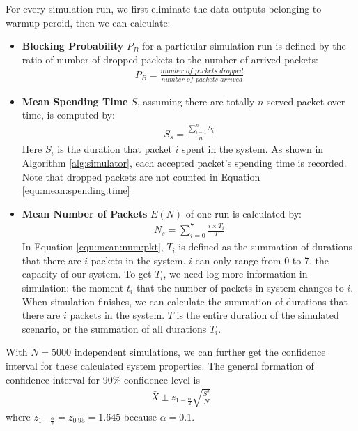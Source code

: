 \documentclass[12pt]{article}  %
\theoremstyle{definition}
\theoremstyle{remark}
\begin{document}
For every simulation run, we first eliminate the data outputs belonging to warmup peroid, then we can calculate:
\begin{itemize}
\item \textbf{Blocking Probability} $P_B$ for a particular simulation run is defined by the ratio of number of dropped packets to the number of arrived packets:
\begin{align}
        \label{equ:block:prob}
        P_B = \frac{\textit{number of packets dropped}}{\textit{number of packets arrived}}
\end{align}

\item \textbf{Mean Spending Time} $S$, assuming there are totally $n$ served packet over time, is computed by:
\begin{align}
        \label{equ:mean:spending:time}
        S_s = \frac{\sum_{i=1}^{n}S_i}{n}
\end{align}
Here $S_i$ is the duration that packet $i$ spent in the system. 
As shown in Algorithm \ref{alg:simulator}, each accepted packet's spending time is recorded. 
Note that dropped packets are not counted in Equation \ref{equ:mean:spending:time}
\item \textbf{Mean Number of Packets} $E(N)$ of one run is calculated by:
\begin{align}
        \label{equ:mean:num:pkt}
        N_s = \sum_{i=0}^{7}\frac{i \times T_i}{T}
\end{align}
In Equation \ref{equ:mean:num:pkt}, $T_i$ is defined as the summation of durations that there are $i$ packets in the system.
$i$ can only range from 0 to 7, the capacity of our system.
To get $T_i$, we need log more information in simulation: the moment $t_i$ that the number of packets in system changes to $i$.
When simulation finishes, we can calculate the summation of durations that there are $i$ packets in the system.
$T$ is the entire duration of the simulated scenario, or the summation of all durations $T_i$.
\end{itemize}

With $N=5000$ independent simulations, we can further get the confidence interval for these calculated system properties.
The general formation of confidence interval for 90\% confidence level is
\begin{align}
        \label{equ:confidence:interval}
        \bar{X}\pm z_{1-\frac{\alpha}{2}}\sqrt{\frac{S^2}{N}}
\end{align}
where $z_{1-\frac{\alpha}{2}} = z_{0.95} = 1.645$ because $\alpha=0.1$.
\end{document}
